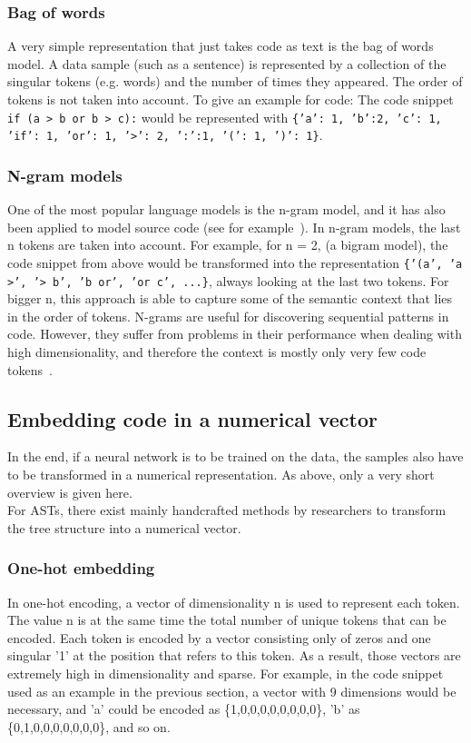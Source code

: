 \documentclass[
	a4paper,
	pagesize,
	pdftex,
	12pt,
	twoside, %
	BCOR=5mm, %
	ngerman,
	fleqn,
	final,
	]{scrartcl}
\begin{document}
\subsubsection{Bag of words}\label{bag-of-words}
A very simple representation that just takes code as text is the bag of words model. A data sample (such as a sentence) is represented by a collection of the singular tokens (e.g. words) and the number of times they appeared. The order of tokens is not taken into account. To give an example for code: The code snippet \texttt{if (a > b or b > c):} would be represented with \texttt{\{'a': 1, 'b':2, 'c': 1, 'if': 1, 'or': 1, '>': 2, ':':1, '(': 1, ')': 1\}}.

\subsubsection{N-gram models}\label{n-gram}
One of the most popular language models is the n-gram model, and it has also been applied to model source code (see for example~\cite{Pang.2015}). In n-gram models, the last n tokens are taken into account. For example, for n = 2, (a bigram model), the code snippet from above would be transformed into the representation \texttt{\{'(a', 'a >', '> b', 'b or', 'or c', ...\}}, always looking at the last two tokens. For bigger n, this approach is able to capture some of the semantic context that lies in the order of tokens. N-grams are useful for discovering sequential patterns in code. However, they suffer from problems in their performance when dealing with high dimensionality, and therefore the context is mostly only very few code tokens~\cite{Dam.2016}.


\subsection{Embedding code in a numerical vector}
In the end, if a neural network is to be trained on the data, the samples also have to be transformed in a numerical representation. As above, only a very short overview is given here.\\
For ASTs, there exist mainly handcrafted methods by researchers to transform the tree structure into a numerical vector.

\subsubsection{One-hot embedding}\label{one-hot}
In one-hot encoding, a vector of dimensionality n is used to represent each token. The value n is at the same time the total number of unique tokens that can be encoded. Each token is encoded by a vector consisting only of zeros and one singular '1' at the position that refers to this token. As a result, those vectors are extremely high in dimensionality and sparse. For example, in the code snippet used as an example in the previous section, a vector with 9 dimensions would be necessary, and 'a' could be encoded as \{1,0,0,0,0,0,0,0,0\}, 'b' as \{0,1,0,0,0,0,0,0,0\}, and so on.
\end{document}
